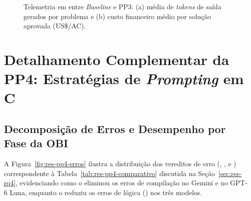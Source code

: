 \begin{table}[!htbp]
\centering
\caption{Consumo médio de \textit{tokens}, custo total e custo por solução aceita em  (\textit{Baseline} $\rightarrow$ \texttt{PP3}).}
\label{tab:res-pp3-custos}
\end{table}

\begin{figure}[!htbp]
\centering

\caption[Tokens de saída e custo por AC em C na PP3]{Telemetria em  entre \textit{Baseline} e PP3: (a) média de \textit{tokens} de saída gerados por problema e (b) custo financeiro médio por solução aprovada (US\$/AC).}
\label{fig:res-pp3-tokens-custo}
\end{figure}
\FloatBarrier

\section{Detalhamento Complementar da PP4: Estratégias de \texorpdfstring{\textit{Prompting}}{Prompting} em C}\label{ap:pp4-detalhes}

\subsection{Decomposição de Erros e Desempenho por Fase da OBI}\label{sec:res-rq4-comp}

A Figura~\ref{fig:res-pp4-erros} ilustra a distribuição dos vereditos de erro (, ,  e ) correspondente à Tabela~\ref{tab:res-pp4-comparativo} discutida na Seção~\ref{sec:res-rq4}, evidenciando como o  eliminou os erros de compilação no Gemini e no GPT-6 Luna, enquanto o  reduziu os erros de lógica () nos três modelos.

